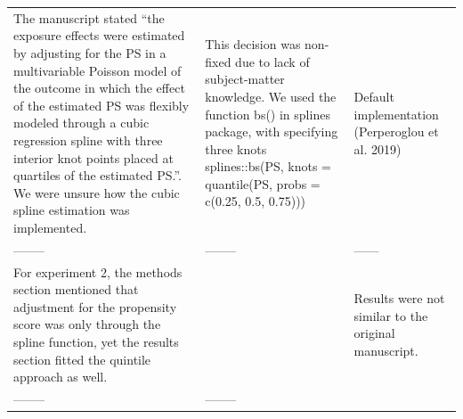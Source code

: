 \documentclass[10,a4paperpaper,]{article}
\begin{document}
\begin{longtable}[]{@{}lll@{}}
\begin{minipage}[t]{0.33\columnwidth}
The manuscript stated ``the exposure effects were estimated by adjusting
for the PS in a multivariable Poisson model of the outcome in which the
effect of the estimated PS was flexibly modeled through a cubic
regression spline with three interior knot points placed at quartiles of
the estimated PS.''. We were unsure how the cubic spline estimation was
implemented.\strut
\end{minipage} & \begin{minipage}[t]{0.33\columnwidth}\raggedright
This decision was non-fixed due to lack of subject-matter knowledge. We
used the function bs() in splines package, with specifying three knots
splines::bs(PS, knots = quantile(PS, probs = c(0.25, 0.5, 0.75)))\strut
\end{minipage} & \begin{minipage}[t]{0.25\columnwidth}\raggedright
Default implementation (Perperoglou et al. 2019)\strut
\end{minipage}\tabularnewline
\begin{minipage}[t]{0.33\columnwidth}\raggedright
--------\strut
\end{minipage} & \begin{minipage}[t]{0.33\columnwidth}\raggedright
--------\strut
\end{minipage} & \begin{minipage}[t]{0.25\columnwidth}\raggedright
------\strut
\end{minipage}\tabularnewline
\begin{minipage}[t]{0.33\columnwidth}\raggedright
For experiment 2, the methods section mentioned that adjustment for the
propensity score was only through the spline function, yet the results
section fitted the quintile approach as well.\strut
\end{minipage} & \begin{minipage}[t]{0.33\columnwidth}\raggedright
\strut
\end{minipage} & \begin{minipage}[t]{0.25\columnwidth}\raggedright
Results were not similar to the original manuscript.\strut
\end{minipage}\tabularnewline
\begin{minipage}[t]{0.33\columnwidth}\raggedright
--------\strut
\end{minipage} & \begin{minipage}[t]{0.33\columnwidth}\raggedright
--------\strut
\end{minipage} & \begin{minipage}[t]{0.25\columnwidth}\raggedright

\end{minipage}
\end{longtable}
\end{document}
